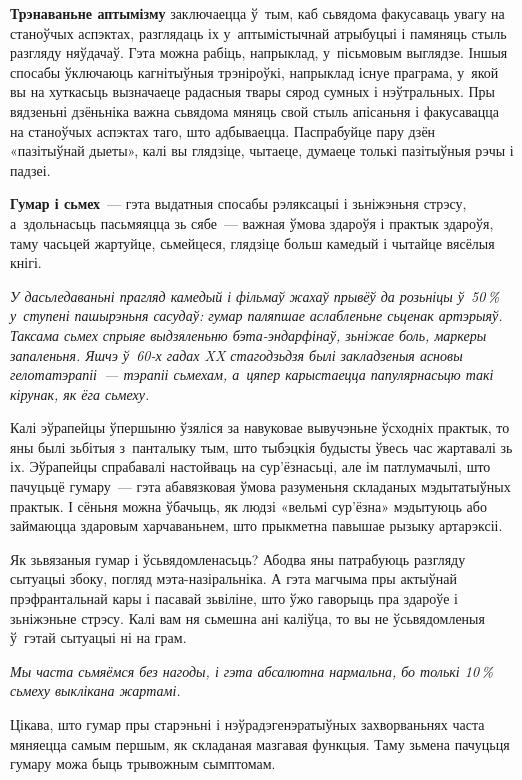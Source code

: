 \textbf{Трэнаваньне аптымізму} заключаецца ў~тым, каб сьвядома факусаваць увагу на станоўчых аспэктах, разглядаць іх у~аптымістычнай атрыбуцыі і памяняць стыль разгляду няўдачаў. Гэта можна рабіць, напрыклад, у~пісьмовым выглядзе. Іншыя спосабы ўключаюць кагнітыўныя трэніроўкі, напрыклад існуе праграма, у~якой вы на хуткасьць вызначаеце радасныя твары сярод сумных і нэўтральных. Пры вядзеньні дзёньніка важна сьвядома мяняць свой стыль апісаньня і факусавацца на станоўчых аспэктах таго, што адбываецца. Паспрабуйце пару дзён «пазітыўнай дыеты», калі вы глядзіце, чытаеце, думаеце толькі пазітыўныя рэчы і падзеі.

\textbf{Гумар і сьмех}~--- гэта выдатныя спосабы рэляксацыі і зьніжэньня стрэсу, а~здольнасьць пасьмяяцца зь сябе~--- важная ўмова здароўя і практык здароўя, таму часьцей жартуйце, сьмейцеся, глядзіце больш камедый і чытайце вясёлыя кнігі. 

\emph{У дасьледаваньні прагляд камедый і фільмаў жахаў прывёў да розьніцы ў~50\,\% у~ступені пашырэньня сасудаў: гумар паляпшае аслабленьне сьценак артэрыяў. Таксама сьмех спрыяе выдзяленьню бэта-эндарфінаў, зьніжае боль, маркеры запаленьня. Яшчэ ў~60-х гадах XX стагодзьдзя былі закладзеныя асновы гелотатэрапіі~--- тэрапіі сьмехам, а~цяпер карыстаецца папулярнасьцю такі кірунак, як ёга сьмеху.}

Калі эўрапейцы ўпершыню ўзяліся за навуковае вывучэньне ўсходніх практык, то яны былі зьбітыя з~панталыку тым, што тыбэцкія будысты ўвесь час жартавалі зь іх. Эўрапейцы спрабавалі настойваць на сур'ёзнасьці, але ім патлумачылі, што пачуцьцё гумару~--- гэта абавязковая ўмова разуменьня складаных мэдытатыўных практык. І сёньня можна ўбачыць, як людзі «вельмі сур'ёзна» мэдытуюць або займаюцца здаровым харчаваньнем, што прыкметна павышае рызыку артарэксіі. 

Як зьвязаныя гумар і ўсьвядомленасьць? Абодва яны патрабуюць разгляду сытуацыі збоку, погляд мэта-назіральніка. А гэта магчыма пры актыўнай прэфрантальнай кары і пасавай зьвіліне, што ўжо гаворыць пра здароўе і зьніжэньне стрэсу. Калі вам ня сьмешна ані каліўца, то вы не ўсьвядомленыя ў~гэтай сытуацыі ні на грам. 

\emph{Мы часта сьмяёмся без нагоды, і гэта абсалютна нармальна, бо толькі 10\,\% сьмеху выклікана жартамі.}

Цікава, што гумар пры старэньні і нэўрадэгенэратыўных захворваньнях часта мяняецца самым першым, як складаная мазгавая функцыя. Таму зьмена пачуцьця гумару можа быць трывожным сымптомам.

